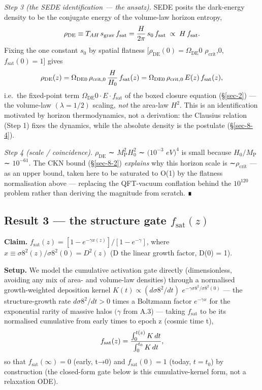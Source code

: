\documentclass[preprint,12pt]{elsarticle}
\begin{document}
\emph{Step 3 (the SEDE identification --- the ansatz).} SEDE posits the
dark-energy density to be the conjugate energy of the volume-law horizon
entropy,
\begin{equation}\rho_{\rm DE} \equiv T_{AH}\,s_{\rm grav}\,f_{\rm sat} = \frac{H}{2\pi}\,s_0\,f_{\rm sat} \;\propto\; H\,f_{\rm sat}.\end{equation}
Fixing the one constant \(s_{0}\) by spatial flatness
\([\rho _\mathrm{DE}(0) = \Omega _\mathrm{DE}0\)
\(\rho _{\mathrm{crit}}\),0, \(f_{\mathrm{sat}}(0) = 1\){]} gives
\begin{equation}\rho_{\rm DE}(z) = \Omega_{\rm DE0}\,\rho_{\rm crit,0}\,\frac{H}{H_0}\,f_{\rm sat}(z)
= \Omega_{\rm DE0}\,\rho_{\rm crit,0}\,E(z)\,f_{\rm sat}(z),\end{equation} i.e.~the
fixed-point term \(\Omega _\mathrm{DE}0\cdot E\cdot f_{\mathrm{sat}}\)
of the boxed closure equation (§\ref{sec-2}) --- the volume-law
\((\lambda  = 1/2)\) scaling, \emph{not} the area-law \(H^{2}\). This is
an identification motivated by horizon thermodynamics, not a derivation:
the Clausius relation (Step 1) fixes the dynamics, while the absolute
density is the postulate (§\ref{sec-8-4}).

\emph{Step 4 (scale / coincidence).} \(\rho _\mathrm{DE}\) ∼
\(M_{\mathrm{P}}^{2}H_{0}^{2}\) ∼ \((10^{-3}\) \(eV)^{4}\) is small
because \(H_{0}/M_{\mathrm{P}}\) ∼ \(10^{-61}\). The CKN bound
(§\ref{sec-8-2}) \emph{explains} why this horizon scale is
∼\(\rho _{\mathrm{crit}}\) --- as an upper bound, taken here to be
saturated to O(1) by the flatness normalisation above --- replacing the
QFT-vacuum conflation behind the \(10^{120}\) problem rather than
deriving the magnitude from scratch. ∎

\subsection{\texorpdfstring{Result 3 --- the structure gate
\(f_{\mathrm{sat}}(z)\)}{Result 3 --- the structure gate f\_\{\textbackslash mathrm\{sat\}\}(z)}}\label{sec-A-2}

\textbf{Claim.}
\(f_{\mathrm{sat}}(z) = [1 - e^{-\gamma  x(z)}]/[1 - e^{-\gamma }]\),
where \(x \equiv  \sigma 8^{2}(z)/\sigma 8^{2}(0) = D^{2}(z)\) (D the
linear growth factor, D(0) = 1).

\textbf{Setup.} We model the cumulative activation gate directly
(dimensionless, avoiding any mix of area- and volume-law densities)
through a normalised growth-weighted deposition kernel
\(K(t) \propto  (d\sigma 8^{2}/dt)\)
\(e^{-\gamma \sigma 8^{2}/\sigma 8^{2}(0)}\) --- the structure-growth
rate \(d\sigma 8^{2}/dt > 0\) times a Boltzmann factor \(e^{-\gamma x}\)
for the exponential rarity of massive halos \((\gamma\) from A.3) ---
taking \(f_{\mathrm{sat}}\) to be its normalised cumulative from early
times to epoch z (cosmic time t),
\begin{equation}f_{\rm sat}(z) = \frac{\int_0^{t(z)} K\,dt}{\int_0^{t_0} K\,dt},\end{equation} so
that \(f_{\mathrm{sat}}(\infty ) = 0\) (early, t→0) and
\(f_{\mathrm{sat}}(0) = 1\) (today, \(t = t_{0}\)) by construction (the
closed-form gate below is this cumulative-kernel form, not a relaxation
ODE).
\end{document}
